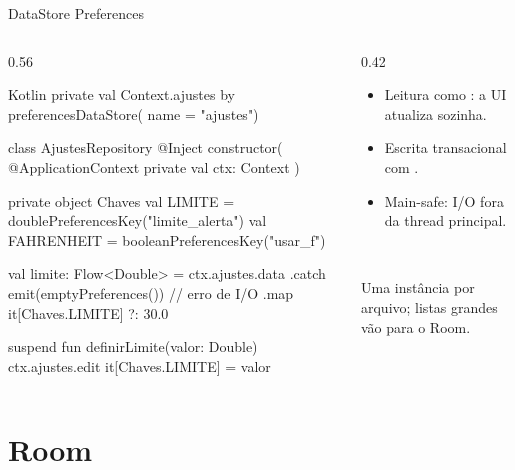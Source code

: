 \documentclass[aspectratio=169,10pt]{beamer}
\begin{document}
\begin{frame}[fragile]{DataStore Preferences}
  \begin{columns}[T]
    \begin{column}{0.56\textwidth}
\begin{codigo}[title=AjustesRepository.kt]{Kotlin}
private val Context.ajustes by preferencesDataStore(
  name = "ajustes")

class AjustesRepository @Inject constructor(
  @ApplicationContext private val ctx: Context
) {
  private object Chaves {
    val LIMITE = doublePreferencesKey("limite_alerta")
    val FAHRENHEIT = booleanPreferencesKey("usar_f")
  }

  val limite: Flow<Double> = ctx.ajustes.data
    .catch { emit(emptyPreferences()) }  // erro de I/O
    .map { it[Chaves.LIMITE] ?: 30.0 }

  suspend fun definirLimite(valor: Double) {
    ctx.ajustes.edit { it[Chaves.LIMITE] = valor }
  }
}
\end{codigo}
    \end{column}
    \begin{column}{0.42\textwidth}
      \begin{conceito}[Características]
        \begin{itemize}
          \item Leitura como : a UI atualiza sozinha.
          \item Escrita transacional com .
          \item Main-safe: I/O fora da thread principal.
        \end{itemize}
      \end{conceito}
      \begin{dica}[Dependência]
        \\
      \end{dica}
      \begin{atencao}
        Uma instância por arquivo; listas grandes vão para o Room.
      \end{atencao}
    \end{column}
  \end{columns}
\end{frame}

\section{Room}
\end{document}
